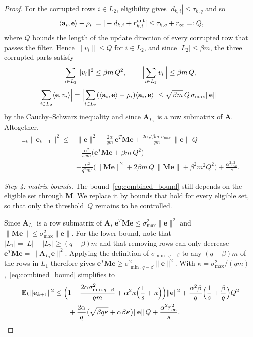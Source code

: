 \documentclass[pdflatex,sn-mathphys-num]{sn-jnl}
\theoremstyle{thmstyleone}
\theoremstyle{thmstylethree}
\newcommand{\proofstep}[1]{\par\medskip\noindent\emph{#1}}
\newcommand{\mA}{\mathbf{A}}
\newcommand{\va}{\mathbf{a}}
\newcommand{\ve}{\mathbf{e}}
\begin{document}
\begin{proof}
For the corrupted rows $i\in L_2$, eligibility gives
$|d_{k,i}|\le\tau_{k,q}$ and so
\[
|\langle\va_i,\ve\rangle-\rho_i|=|-d_{k,i}+r^{\rm qnt}_{k,i}|
\le\tau_{k,q}+r_\infty=:Q,
\]
where $Q$ bounds the length of the update direction of every corrupted row
that passes the filter.
Hence $\|v_i\|\le Q$ for $i\in L_2$, and since $|L_2|\le\beta m$, the three
corrupted parts satisfy
\[
\sum_{i\in L_2}\|v_i\|^2\le\beta m\,Q^2,
\qquad
\Bigl\|\sum_{i\in L_2}v_i\Bigr\|\le\beta m\,Q,
\]
\[
\begin{aligned}
\Bigl|\sum_{i\in L_2}\langle\ve,v_i\rangle\Bigr|
&=\Bigl|\sum_{i\in L_2}(\langle\va_i,\ve\rangle-\rho_i)
\langle\va_i,\ve\rangle\Bigr|
\le\sqrt{\beta m}\,Q\,\sigma_{\max}\|\ve\| 
\end{aligned}
\]
by the Cauchy--Schwarz inequality and since $\mA_{L_2}$ is a row
submatrix of $\mA$. Altogether, 
\begin{equation}
\label{eq:combined_bound}
\begin{aligned}
\mathbb E_k\|\ve_{k+1}\|^2
\le{}&\|\ve\|^2-\frac{2\alpha}{qm}\,\ve^T\mathbf M\ve
+\frac{2\alpha\sqrt{\beta m}\,\sigma_{\max}}{qm}\,\|\ve\|\,Q\\
&+\frac{\alpha^2}{sqm}\bigl(\ve^T\mathbf M\ve+\beta m\,Q^2\bigr)\\
&+\frac{\alpha^2}{q^2m^2}\bigl(\|\mathbf M\ve\|^2
+2\beta m\,Q\,\|\mathbf M\ve\|+\beta^2m^2Q^2\bigr)
+\frac{\alpha^2r_\infty^2}{s}.
\end{aligned}
\end{equation}

\proofstep{Step 4: matrix bounds.} The bound~\eqref{eq:combined_bound}
still depends on the eligible set through $\mathbf M$. We replace it by
bounds that hold for every eligible set, so that only the threshold~$Q$
remains to be controlled. 

Since $\mA_{L_1}$ is a row submatrix
of $\mA$, $\ve^T\mathbf M\ve\le\sigma_{\max}^2\|\ve\|^2$ and
$\|\mathbf M\ve\|\le\sigma_{\max}^2\|\ve\|$. For the lower bound, note that
$|L_1|=|L|-|L_2|\ge(q-\beta)m$ and that removing rows can only decrease
$\ve^T\mathbf M\ve=\|\mA_{L_1}\ve\|^2$. Applying the definition of
$\sigma_{\min,q-\beta}$ to any $(q-\beta)m$ of the rows in $L_1$ therefore
gives $\ve^T\mathbf M\ve\ge\sigma_{\min,q-\beta}^2\|\ve\|^2$.  With
$\kappa = \sigma_{\max}^2/(qm)$,~\eqref{eq:combined_bound} simplifies to
\begin{equation}
\label{eq:pre_quantile}
\begin{aligned}
\mathbb E_k\|\ve_{k+1}\|^2
&\le\Bigl(1-\frac{2\alpha\sigma_{\min,q-\beta}^2}{qm}
+\alpha^2\kappa\Bigl(\frac1s+\kappa\Bigr)\Bigr)\|\ve\|^2
+\frac{\alpha^2\beta}{q}\Bigl(\frac1s+\frac\beta q\Bigr)Q^2\\
&\qquad+\frac{2\alpha}{q}\bigl(\sqrt{\beta q\kappa}+\alpha\beta\kappa\bigr)
\|\ve\|\,Q+\frac{\alpha^2r_\infty^2}{s}.
\end{aligned}
\end{equation}


\end{proof}
\end{document}
